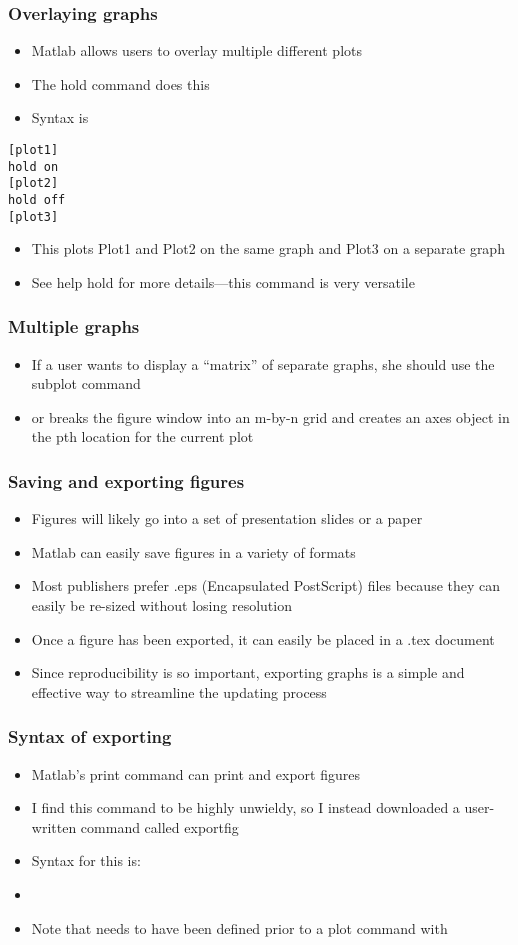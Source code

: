 \documentclass[english,xcolor=dvipsnames]{beamer}
\newcommand{\bi}{\begin{itemize}}
\newcommand{\ei}{\end{itemize}}
\begin{document}
\begin{frame}[fragile]
\frametitle{Overlaying graphs}
   \bi 
   \item Matlab allows users to overlay multiple different plots
   \item The hold command does this
   \item Syntax is
   \ei
\begin{lstlisting}
[plot1]
hold on
[plot2]
hold off
[plot3]
\end{lstlisting}
   \bi
   \item This plots Plot1 and Plot2 on the same graph and Plot3 on a separate graph
   \item See help hold for more details---this command is very versatile
   \ei
\end{frame}

\begin{frame}
\frametitle{Multiple graphs}
   \bi 
   \item If a user wants to display a ``matrix'' of separate graphs, she should use the subplot command
   \item {} or  breaks the figure window into an m-by-n grid and creates an axes object in the pth location for the current plot
   \ei
\end{frame}

\begin{frame}
\frametitle{Saving and exporting figures}
   \bi
   \item Figures will likely go into a set of presentation slides or a paper
   \item Matlab can easily save figures in a variety of formats 
   \item Most publishers prefer .eps (Encapsulated PostScript) files because they can easily be re-sized without losing resolution
   \item Once a figure has been exported, it can easily be placed in a .tex document
   \item Since reproducibility is so important, exporting graphs is a simple and effective way to streamline the updating process
   \ei
\end{frame}

\begin{frame}
\frametitle{Syntax of exporting}
   \bi
   \item Matlab's print command can print and export figures
   \item I find this command to be highly unwieldy, so I instead downloaded a user-written command called exportfig
   \item Syntax for this is:
   \item {}
   \item Note that  needs to have been defined prior to a plot command with 
   \ei
\end{frame}
\end{document}
